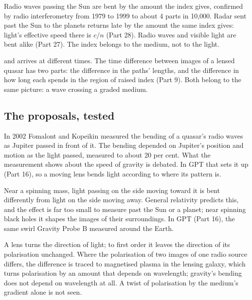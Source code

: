  Radio waves passing the Sun are bent by the amount the index gives, confirmed by radio interferometry from 1979 to 1999 to about 4 parts in 10,000. Radar sent past the Sun to the planets returns late by the amount the same index gives: light's effective speed there is $c/n$ (Part 28). Radio waves and visible light are bent alike (Part 27). The index belongs to the medium, not to the light.

 and arrives at different times. The time difference between images of a lensed quasar has two parts: the difference in the paths' lengths, and the difference in how long each spends in the region of raised index (Part 9). Both belong to the same picture: a wave crossing a graded medium.

\subsection{The proposals, tested}

 In 2002 Fomalont and Kopeikin measured the bending of a quasar's radio waves as Jupiter passed in front of it. The bending depended on Jupiter's position and motion as the light passed, measured to about 20 per cent. What the measurement shows about the speed of gravity is debated. In GPT  that sets it up (Part 16), so a moving lens bends light according to where its pattern is.

 Near a spinning mass, light passing on the side moving toward it is bent differently from light on the side moving away. General relativity predicts this, and the effect is far too small to measure past the Sun or a planet; near spinning black holes it shapes the images of their surroundings. In GPT  (Part 16), the same swirl Gravity Probe B measured around the Earth.

 A lens turns the direction of light; to first order it leaves the direction of its polarisation unchanged. Where the polarisation of two images of one radio source differs, the difference is traced to magnetised plasma in the lensing galaxy, which turns polarisation by an amount that depends on wavelength; gravity's bending does not depend on wavelength at all. A twist of polarisation by the medium's gradient alone is not seen.


